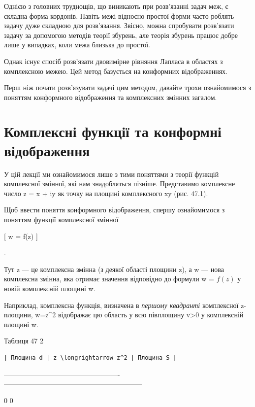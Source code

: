 \documentclass[
]{article}
\begin{document}
{Однією з головних труднощів, що виникають при розв'язанні задач меж, є
складна форма кордонів. Навіть межі відносно простої форми часто роблять
задачу дуже складною для розв'язання. Звісно, можна спробувати
розв'язати задачу за допомогою методів теорії збурень, але теорія
збурень працює добре лише у випадках, коли межа близька до простої.

Однак існує спосіб розв'язати двовимірне рівняння Лапласа в областях з
комплексною межею. Цей метод базується на конформних відображеннях.

Перш ніж почати розв'язувати задачі цим методом, давайте трохи
ознайомимося з поняттям конформного відображення та комплексних змінних
загалом.

\section{Комплексні функції та конформні
відображення}\label{ux43aux43eux43cux43fux43bux435ux43aux441ux43dux456-ux444ux443ux43dux43aux446ux456ux457-ux442ux430-ux43aux43eux43dux444ux43eux440ux43cux43dux456-ux432ux456ux434ux43eux431ux440ux430ux436ux435ux43dux43dux44f}

У цій лекції ми ознайомимося лише з тими поняттями з теорії функцій
комплексної змінної, які нам знадобляться пізніше. Представимо
комплексне число z = x + iy як точку на площині комплексного xy (рис.
47.1).

Щоб ввести поняття конформного відображення, спершу ознайомимося з
поняттям функції комплексної змінної

{[} w = f(z) {]}

.

Тут z --- це комплексна змінна (з деякої області площини z), а w ---
нова комплексна змінна, яка отримає значення відповідно до формули w =
\(f(z)\) у новій комплексній площині w.

Наприклад, комплексна функція, визначена в \emph{першому квадранті}
комплексної z-площини, w=z\^{}2 відображає цю область у всю півплощину
v\textgreater0 у комплексній площині w.

Таблиця 47 2

\begin{verbatim}
| Площина d | z \longrightarrow z^2 | Площина S |
\end{verbatim}

\textbar--------------------------\textbar-------------------------\textbar------------------------------------------------------------\textbar{}

0 \textbar{} \textbar{} 0 \textbar{}

}
\end{document}
